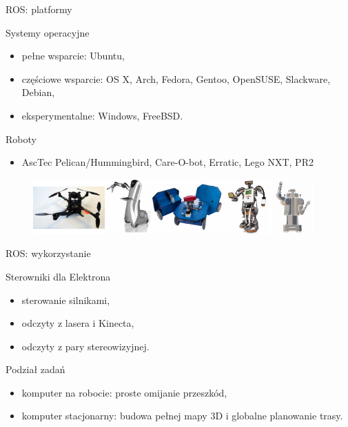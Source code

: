 \documentclass[xcolor=x11names,compress]{beamer}
\renewcommand{\(}{\begin{columns}}
\renewcommand{\)}{\end{columns}}
\newcommand{\<}[1]{\begin{column}{#1}}
\renewcommand{\>}{\end{column}}
\begin{document}
\begin{frame}{ROS: platformy}


    \vspace{.4cm}

    \alert{Systemy operacyjne}
    \begin{itemize}
    \item pełne wsparcie: Ubuntu,
    \item częściowe wsparcie: OS X, Arch, Fedora, Gentoo, OpenSUSE, Slackware, Debian,
    \item eksperymentalne: Windows, FreeBSD.
    \end{itemize}

    \vspace{.4cm}

    \alert{Roboty}
    \begin{itemize}
    \item AscTec Pelican/Hummingbird, Care-O-bot, Erratic, Lego NXT, PR2
    \end{itemize}

    \begin{figure}[h!]
    \centering
    \includegraphics[width=10.8cm]{../Common/ros/robots}
    \end{figure}

\end{frame}


\begin{frame}{ROS: wykorzystanie}

    \alert{Sterowniki dla Elektrona}
    \begin{itemize}
    \item sterowanie silnikami,
    \item odczyty z lasera i Kinecta,
    \item odczyty z pary stereowizyjnej.
    \end{itemize}

    \vspace{.4cm}

    \alert{Podział zadań}
    \begin{itemize}
    \item komputer na robocie: proste omijanie przeszkód,
    \item komputer stacjonarny: budowa pełnej mapy 3D i globalne planowanie trasy.
    \end{itemize}


\end{frame}
\end{document}
